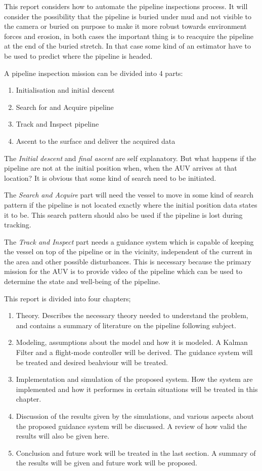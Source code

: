	This report considers how to automate the pipeline inspections process. It will consider the
	possibility that the pipeline is buried under mud and not visible to the camera or buried on purpose
	to make it more robust towards environment forces and erosion, in both cases the important thing 
	is to reacquire the pipeline at the end of the buried stretch. In that case some kind of an
	estimator have to be used to predict where the pipeline is headed.
	
	A pipeline inspection mission can be divided into 4 parts:
	\begin{enumerate}
	 \item Initialisation and initial descent
	 \item Search for and Acquire pipeline
	 \item Track and Inspect pipeline
	 \item Ascent to the surface and deliver the acquired data
	\end{enumerate}

	The \textit{Initial descent} and \textit{final ascent} are self explanatory. But what happens if the
	pipeline are not at the initial position when, when the AUV arrives at that location? It is obvious
	that some kind of search need to be initiated. 
	
	The \textit{Search and Acquire} part will need the vessel to move in some kind of search pattern if
	the pipeline is not located exactly where the initial position data states it to be. This search
	pattern should also be used if the pipeline is lost during tracking. 
	
	The \textit{Track and Inspect} part needs a guidance system which is capable of keeping the vessel 
	on top of the pipeline or in the vicinity, independent of the current in the area and other possible 
	disturbances. This is
	necessary because the primary mission for the AUV is to provide video of the pipeline which can be
	used to determine the state and well-being of the pipeline.
	
	This report is divided into four chapters;
	\begin{enumerate}
	 \item Theory. Describes the necessary theory needed to understand the problem, and contains a summary
	of literature on the pipeline following subject.
	 \item Modeling, assumptions about the model and how it is modeled. A Kalman Filter and a flight-mode
	 controller will be derived. The guidance system will be treated and desired beahviour will be
	 treated.
	 \item Implementation and simulation of the proposed system. How the system are implemented and how it
	 performes in certain situations will be treated in this chapter. 
	 \item Discussion of the results given by the simulations, and various aspects about the proposed
	 guidance system will be discussed. A review of how valid the results will also be given here.
	 \item Conclusion and future work will be treated in the last section. A summary of the results will
	 be given and future work will be proposed.
	\end{enumerate}

	
	
	

